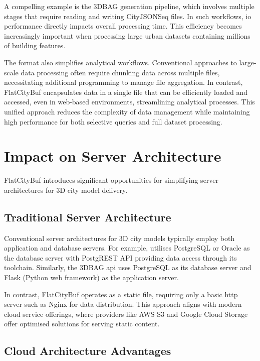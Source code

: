 A compelling example is the 3DBAG generation pipeline, which involves multiple stages that require reading and writing CityJSONSeq files. In such workflows, \ac{io} performance directly impacts overall processing time. This efficiency becomes increasingly important when processing large urban datasets containing millions of building features.

The format also simplifies analytical workflows. Conventional approaches to large-scale data processing often require chunking data across multiple files, necessitating additional programming to manage file aggregation. In contrast, FlatCityBuf encapsulates data in a single file that can be efficiently loaded and accessed, even in web-based environments, streamlining analytical processes. This unified approach reduces the complexity of data management while maintaining high performance for both selective queries and full dataset processing.

\section{Impact on Server Architecture}
\label{affect_on_server_architecture}

FlatCityBuf introduces significant opportunities for simplifying server architectures for 3D city model delivery.

\subsection{Traditional Server Architecture}
\label{traditional_server_architecture}

Conventional server architectures for 3D city models typically employ both application and database servers. For example, \citet{3dcitydb} utilises PostgreSQL or Oracle as the database server with PostgREST API \citep{postgrest} providing data access through its toolchain. Similarly, the 3DBAG \ac{api} uses PostgreSQL as its database server and Flask (Python web framework) as the application server.

In contrast, FlatCityBuf operates as a static file, requiring only a basic \ac{http} server such as Nginx \citep{nginx} for data distribution. This approach aligns with modern cloud service offerings, where providers like AWS S3 \citep{s3} and Google Cloud Storage \citep{gsc} offer optimised solutions for serving static content.

\subsection{Cloud Architecture Advantages}
\label{cloud_architecture_achieved}

